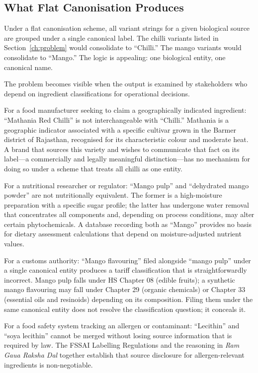 \documentclass[12pt,a3paper]{article}
\begin{document}
\subsection{What Flat Canonisation Produces}

Under a flat canonisation scheme, all variant strings for a given biological source are grouped under a single canonical label. The chilli variants listed in Section~\ref{ch:problem} would consolidate to ``Chilli.'' The mango variants would consolidate to ``Mango.'' The logic is appealing: one biological entity, one canonical name.

The problem becomes visible when the output is examined by stakeholders who depend on ingredient classifications for operational decisions.

For a food manufacturer seeking to claim a geographically indicated ingredient: ``Mathania Red Chilli'' is not interchangeable with ``Chilli.'' Mathania is a geographic indicator associated with a specific cultivar grown in the Barmer district of Rajasthan, recognised for its characteristic colour and moderate heat. A brand that sources this variety and wishes to communicate that fact on its label---a commercially and legally meaningful distinction---has no mechanism for doing so under a scheme that treats all chilli as one entity.

For a nutritional researcher or regulator: ``Mango pulp'' and ``dehydrated mango powder'' are not nutritionally equivalent. The former is a high-moisture preparation with a specific sugar profile; the latter has undergone water removal that concentrates all components and, depending on process conditions, may alter certain phytochemicals. A database recording both as ``Mango'' provides no basis for dietary assessment calculations that depend on moisture-adjusted nutrient values.

For a customs authority: ``Mango flavouring'' filed alongside ``mango pulp'' under a single canonical entity produces a tariff classification that is straightforwardly incorrect. Mango pulp falls under HS Chapter 08 (edible fruits); a synthetic mango flavouring may fall under Chapter 29 (organic chemicals) or Chapter 33 (essential oils and resinoids) depending on its composition. Filing them under the same canonical entity does not resolve the classification question; it conceals it.

For a food safety system tracking an allergen or contaminant: ``Lecithin'' and ``soya lecithin'' cannot be merged without losing source information that is required by law. The FSSAI Labelling Regulations and the reasoning in \textit{Ram Gaua Raksha Dal} \cite{DelhiHC_RamGaua_2022} together establish that source disclosure for allergen-relevant ingredients is non-negotiable.
\end{document}
